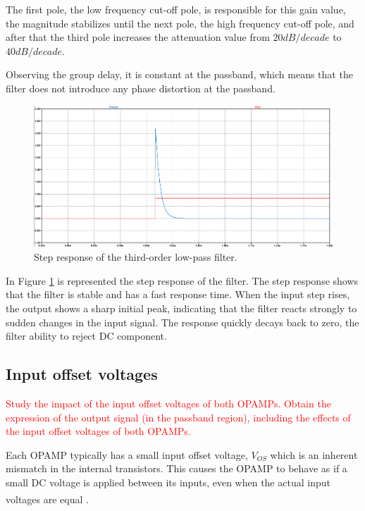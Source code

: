 The first pole, the low frequency cut-off pole, is responsible for this gain value, the magnitude stabilizes until the next pole, the high frequency cut-off pole, and after that the third pole increases the attenuation value from $20dB/decade$ to $40dB/decade$.

Observing the group delay, it is constant at the passband, which means that the filter does not introduce any phase distortion at the passband.

\begin{figure}[H]
    \centering
    \includegraphics[width=1\linewidth]{images/step_ex2_sim.png}
    \caption{Step response of the third-order low-pass filter.}
    \label{fig:ex2_step}
\end{figure}

In Figure \ref{fig:ex2_step} is represented the step response of the filter. The step response shows that the filter is stable and has a fast response time. When the input step rises, the output shows a sharp initial peak, indicating that the filter reacts strongly to sudden changes in the input signal. The response quickly decays back to zero, the filter ability to reject DC component.

\subsection{Input offset voltages}
\textcolor{red}{Study the impact of the input offset voltages of both OPAMPs. Obtain the expression of the output signal (in the passband region), including the effects of the input offset voltages of both OPAMPs.}

Each OPAMP typically has a small input offset voltage, $V_{OS}$ which is an inherent mismatch in the internal transistors. This causes the OPAMP to behave as if a small DC voltage is applied between its inputs, even when the actual input voltages are equal \textsuperscript{\cite{DC-Parameters-Input-Offset-Voltage}}.

